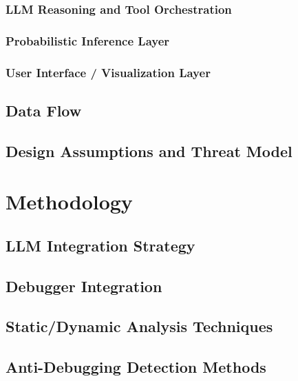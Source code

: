 \documentclass[conference]{IEEEtran}
\begin{document}
\subsubsection{LLM Reasoning and Tool Orchestration}
\subsubsection{Probabilistic Inference Layer}
\subsubsection{User Interface / Visualization Layer}

\subsection{Data Flow}

\subsection{Design Assumptions and Threat Model}

\section{Methodology}

\subsection{LLM Integration Strategy}

\subsection{Debugger Integration}

\subsection{Static/Dynamic Analysis Techniques}

\subsection{Anti-Debugging Detection Methods}
\end{document}
